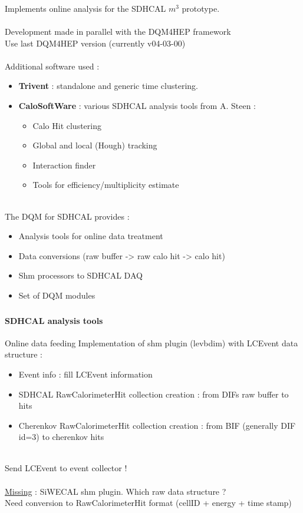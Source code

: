 \documentclass[8pt]{beamer}
\begin{document}
  \begin{frame}
    \frametitle{\secname}
    Implements online analysis for the SDHCAL $m^3$ prototype. \\
    ~ \\
    Development made in parallel with the DQM4HEP framework \\
    Use last DQM4HEP version (currently v04-03-00) \\
    ~ \\
    Additional software used :
    \begin{itemize}
      \item \textbf{Trivent} : standalone and generic time clustering.
      \item \textbf{CaloSoftWare} : various SDHCAL analysis tools from A. Steen :
      \begin{itemize}
        \item Calo Hit clustering
        \item Global and local (Hough) tracking
        \item Interaction finder
        \item Tools for efficiency/multiplicity estimate
      \end{itemize}
    \end{itemize}
    ~ \\
    The DQM for SDHCAL provides :
    \begin{itemize}
      \item Analysis tools for online data treatment
      \item Data conversions (raw buffer -> raw calo hit -> calo hit)
      \item Shm processors to SDHCAL DAQ
      \item Set of DQM modules
    \end{itemize}
  \end{frame}


  \begin{frame}
    \frametitle{\secname}
    \framesubtitle{SDHCAL analysis tools}
    \begin{block}{Online data feeding}
    Implementation of shm plugin (levbdim) with LCEvent data structure :
      \begin{itemize}
        \item Event info : fill LCEvent information
        \item SDHCAL RawCalorimeterHit collection creation : from DIFs raw buffer to hits
        \item Cherenkov RawCalorimeterHit collection creation : from BIF (generally DIF id=3) to cherenkov hits
      \end{itemize}
    \end{block}
    ~ \\
    Send LCEvent to event collector ! \\
    ~ \\
    \underline{Missing} : SiWECAL shm plugin. Which raw data structure ? \\
    Need conversion to RawCalorimeterHit format (cellID + energy + time stamp)
  \end{frame}
\end{document}

